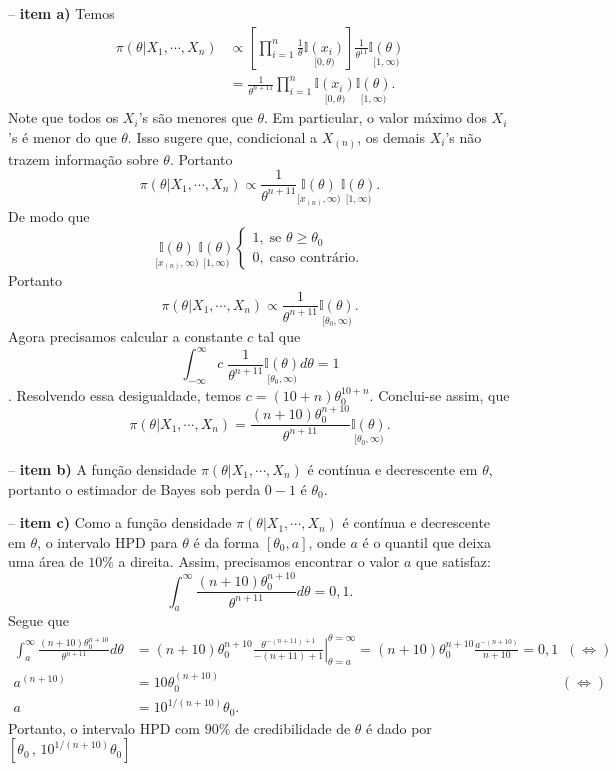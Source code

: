 \documentclass[11pt,a4]{article}\usepackage[]{graphicx}\usepackage[]{xcolor}
\begin{document}
\begin{enumerate}
\begin{solucao}
-- {\bf item a)} Temos
\[
\begin{split}
\pi(\theta|X_1,\cdots,X_n) & \propto \left[ \prod_{i=1}^{n} \frac{1}{\theta} \underset{{[0,\theta)}}{ \mathbb{I}(x_i)}\right] \frac{1}{\theta^{11}}\underset{{[1,\infty)}}{ \mathbb{I}(\theta)}\\
& = \frac{1}{\theta^{n + 11}}  \prod_{i=1}^{n} \underset{{[0,\theta)}}{ \mathbb{I}(x_i)} \underset{{[1,\infty)}}{ \mathbb{I}(\theta)}.
\end{split}
\]
Note que todos os $X_i$'s são menores que $\theta$. Em particular, o valor máximo dos $X_i$'s é menor do que $\theta$. Isso sugere que, condicional a $X_{(n)}$, os demais $X_i$'s não trazem informação sobre $\theta$. Portanto
\[
\pi(\theta|X_1,\cdots,X_n)  \propto \frac{1}{\theta^{n + 11}}   \underset{{[x_{(n)},\infty)}}{ \mathbb{I}(\theta)}   \underset{{[1,\infty)}}{ \mathbb{I}(\theta)}.
\]
De modo que
\[
\underset{{[x_{(n)},\infty)}}{ \mathbb{I}(\theta)}   \underset{{[1,\infty)}}{ \mathbb{I}(\theta)} \left\{\begin{array}{l}
	1,\;\mbox{se $\theta \geq \theta_0$}\\
	0,\;\mbox{caso contrário.}
\end{array} \right.
\]
Portanto
\[
\pi(\theta|X_1,\cdots,X_n)  \propto \frac{1}{\theta^{n + 11}} \underset{{[\theta_0,\infty)}}{ \mathbb{I}(\theta)}.
\]
Agora precisamos calcular a constante $c$ tal que
$$\int_{-\infty}^{\infty} c\; \frac{1}{\theta^{n + 11}} \underset{{[\theta_0,\infty)}}{ \mathbb{I}(\theta)} d\theta = 1$$.
Resolvendo essa desigualdade, temos $c = (10 + n)\theta_0^{10 + n}$. Conclui-se assim, que
\[
\pi(\theta|X_1,\cdots,X_n) = \frac{(n + 10 )\theta_0^{n + 10 }}{\theta^{n + 11}}\underset{{[\theta_0,\infty)}}{ \mathbb{I}(\theta)}.
\]

-- {\bf item b)} A função densidade $\pi(\theta|X_1,\cdots,X_n)$ é contínua e decrescente em $\theta$, portanto o estimador de Bayes sob perda $0-1$ é $\theta_0$.


-- {\bf item c)} Como a função densidade $\pi(\theta|X_1,\cdots,X_n)$ é contínua e decrescente em $\theta$, o intervalo HPD para $\theta$ é da forma $[\theta_0,a]$, onde $a$ é o quantil que deixa uma área de $10\%$ a direita. Assim, precisamos encontrar o valor $a$ que satisfaz:
\[
\int_{a}^{\infty} \frac{(n + 10 )\theta_0^{n + 10 }}{\theta^{n + 11}} d\theta = 0,1.
\]
Segue que
\[
\begin{split}
	\int_{a}^{\infty} \frac{(n + 10 )\theta_0^{n + 10 }}{\theta^{n + 11}} d\theta &= \left.(n + 10 )\theta_0^{n + 10 } \frac{\theta^{-(n + 11)+ 1}}{-(n + 11)+ 1}\right|_{\theta=a}^{\theta=\infty}= (n + 10 )\theta_0^{n + 10 } \frac{a^{-(n + 10)}}{n + 10} = 0,1\;\; (\Leftrightarrow)\\
	a^{(n + 10)} &= 10\theta_0^{(n + 10)} \;\;\hspace{10cm} (\Leftrightarrow)\\
	a &= 10^{1/(n + 10)} \theta_0.
\end{split}
\]
Portanto, o intervalo HPD com $90\%$ de credibilidade de $\theta$ é dado por $[\theta_0\,,\,10^{1/(n + 10)} \theta_0]$


\end{solucao}
\end{enumerate}
\end{document}
